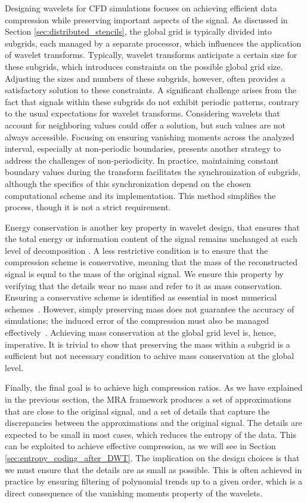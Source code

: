 Designing wavelets for CFD simulations focuses on achieving efficient data compression while preserving important aspects of the signal.
As discussed in Section \ref{sec:distributed_stencils}, the global grid is typically divided into subgrids, each managed by a separate processor, which influences the application of wavelet transforms.
Typically, wavelet transforms anticipate a certain size for these subgrids, which introduces constraints on the possible global grid size.
Adjusting the sizes and numbers of these subgrids, however, often provides a satisfactory solution to these constraints.
A significant challenge arises from the fact that signals within these subgrids do not exhibit periodic patterns, contrary to the usual expectations for wavelet transforms.
Considering wavelets that account for neighboring values could offer a solution, but such values are not always accessible.
Focusing on ensuring vanishing moments across the analyzed interval, especially at non-periodic boundaries, presents another strategy to address the challenges of non-periodicity.
In practice, maintaining constant boundary values during the transform facilitates the synchronization of subgrids, although the specifics of this synchronization depend on the chosen computational scheme and its implementation.
This method simplifies the process, though it is not a strict requirement.

Energy conservation is another key property in wavelet design, that ensures that the total energy or information content of the signal remains unchanged at each level of decomposition .
A less restrictive condition is to ensure that the compression scheme is conservative, meaning that the mass of the reconstructed signal is equal to the mass of the original signal.
We ensure this property by verifying that the details wear no mass and refer to it as mass conservation.
Ensuring a conservative scheme is identified as essential in most numerical schemes~\cite{hou1994nonconservative}.
However, simply preserving mass does not guarantee the accuracy of simulations; the induced error of the compression must also be managed effectively~\cite{cohen2003fully}.
Achieving mass conservation at the global grid level is, hence, imperative.
It is trivial to show that preserving the mass within a subgrid is a sufficient but not necessary condition to achive mass conservation at the global level.

Finally, the final goal is to achieve high compression ratios.
As we have explained in the previous section, the MRA framework produces a set of approximations that are close to the original signal, and a set of details that capture the discrepancies between the approximations and the original signal.
The details are expected to be small in most cases, which reduces the entropy of the data.
This can be exploited to achieve effective compression, as we will see in Section \ref{sec:entropy_coding_after_DWT}.
The implication on the design choices is that we must ensure that the details are as small as possible.
This is often achieved in practice by ensuring filtering of polynomial trends up to a given order, which is a direct consequence of the vanishing moments property of the wavelets.

